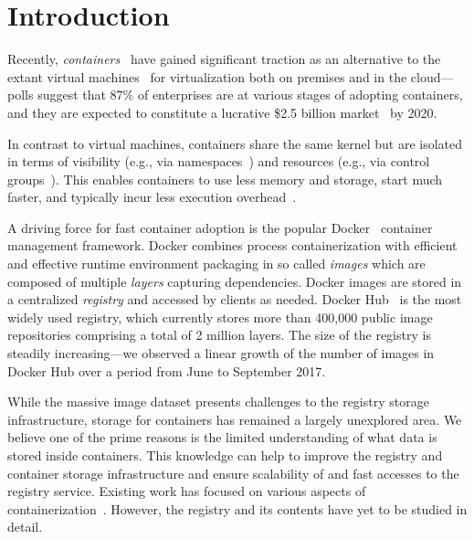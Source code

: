 \section{Introduction}


Recently, \emph{containers}~\cite{process-containers-linux} have
gained significant traction as an alternative to the extant virtual
machines~\cite{rosenblum2005virtual} for virtualization both on
premises and in the cloud---polls suggest that 87\% of enterprises are
at various stages of adopting containers, and they are expected to
constitute a lucrative \$2.5 billion
market~\cite{container-grow-by2020} by 2020.

In contrast to virtual machines, containers share the same kernel but
are isolated in terms of visibility (e.g., via
namespaces~\cite{man-namespaces}) and resources (e.g., via control
groups~\cite{kernel-doc-cgroups}). This enables containers to use
less memory and storage, start much faster, and typically incur less
execution overhead~\cite{Disco, felter2015updated,
	HypervisorsvsLightweight}.
	
A driving force for fast container
adoption is the popular Docker~\cite{docker} container management
framework. Docker combines process containerization with efficient and
effective runtime environment packaging in so called {\em images} which are composed of
multiple {\em layers} capturing dependencies.  
%
Docker
images are stored in a centralized \emph{registry} and accessed by clients as needed.
%
Docker Hub~\cite{docker-hub} is the most widely used registry, which currently
stores more than 400,000 public image repositories comprising a total of 2 million layers.
The size of the registry 
is steadily increasing---we observed a linear growth of the
number of images in Docker Hub over a period from June to September 2017.


While the massive image dataset presents challenges to the registry storage
infrastructure, storage for containers has remained a largely unexplored
area.
%
We believe one of the prime reasons is the limited understanding of what data
is stored inside containers.
%
This knowledge can help to improve the registry and container
storage infrastructure and ensure scalability of and fast accesses to the
registry service.
%
Existing work has focused on various aspects of
containerization~\cite{dockerssd, dockerfinder, analysisdockergithub,
slacker, dockervulnerabile}.
However, the registry and its contents have yet to be studied in detail.

